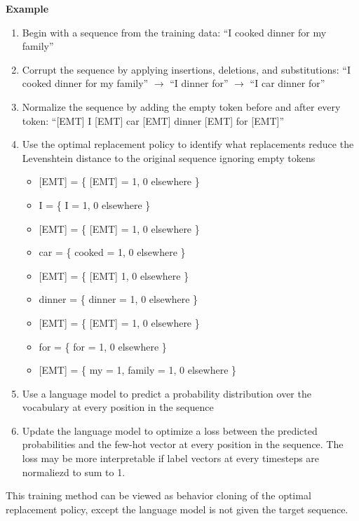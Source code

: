 \documentclass{article}
\begin{document}
\vspace{1em}
\noindent \textbf{Example}
\begin{enumerate}
    \item{Begin with a sequence from the training data: “I cooked dinner for my family”}
    \item{Corrupt the sequence by applying insertions, deletions, and substitutions: “I cooked dinner for my family” $\rightarrow$ “I dinner for” $\rightarrow$ “I car dinner for”}
    \item{Normalize the sequence by adding the empty token before and after every token: “[EMT] I [EMT] car [EMT] dinner [EMT] for [EMT]”}
    \item{Use the optimal replacement policy to identify what replacements reduce the Levenshtein distance to the original sequence ignoring empty tokens}
    \begin{itemize}
            \item{[EMT] = \{ [EMT] = 1, 0 elsewhere \}}
            \item{I = \{ I = 1, 0 elsewhere \}}
            \item{[EMT] = \{ [EMT] = 1, 0 elsewhere \}}
            \item{car = \{ cooked = 1, 0 elsewhere \}}
            \item{[EMT] = \{ [EMT] 1, 0 elsewhere \}}
            \item{dinner = \{ dinner = 1, 0 elsewhere \}}
            \item{[EMT] = \{ [EMT] = 1, 0 elsewhere \}}
            \item{for = \{ for = 1, 0 elsewhere \}}
            \item{[EMT] = \{ my = 1, family = 1, 0 elsewhere \}}
    \end{itemize}

    \item{Use a language model to predict a probability distribution over the vocabulary at every position in the sequence}
    \item{Update the language model to optimize a loss between the predicted probabilities and the few-hot vector at every position in the sequence. The loss may be more interpretable if label vectors at every timesteps are normaliezd to sum to 1.}
\end{enumerate}
        
This training method can be viewed as behavior cloning of the optimal replacement policy, except the language model is not given the target sequence.
\end{document}
